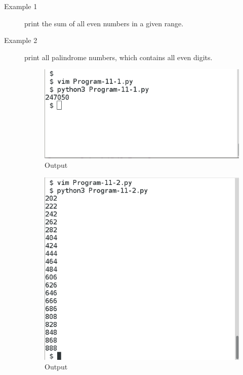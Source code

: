 \documentclass[11pt,a4paper]{article}
\begin{document}
\begin{description}

\item[Example 1] print the sum of all even numbers in a given range.



\item[Example 2] print all palindrome numbers, which contains all even digits.

\begin{figure}[ht]
\begin{center}
\includegraphics[scale=0.4]{Output-11-1.png}
\caption{Output}
\label{Output-11-1}
\end{center}
\end{figure}



\begin{figure}[ht]
\begin{center}
\includegraphics[scale=0.4]{Output-11-2.png}
\caption{Output}
\label{Output-11-2}
\end{center}
\end{figure}
\end{description}
\vfill{}
\end{document}
